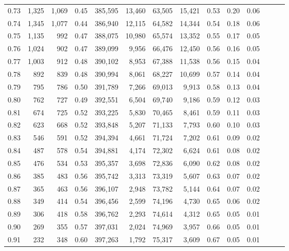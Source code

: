 \begin{tabular}{rrrrrrrrrrrrrr}
0.73 &  1,325 &  1,069 &  0.45 &  385,595 &   13,460 &  63,505 &  15,421 &  0.53 &  0.20 &      0.06 \\
0.74 &  1,345 &  1,077 &  0.44 &  386,940 &   12,115 &  64,582 &  14,344 &  0.54 &  0.18 &      0.06 \\
0.75 &  1,135 &    992 &  0.47 &  388,075 &   10,980 &  65,574 &  13,352 &  0.55 &  0.17 &      0.05 \\
0.76 &  1,024 &    902 &  0.47 &  389,099 &    9,956 &  66,476 &  12,450 &  0.56 &  0.16 &      0.05 \\
0.77 &  1,003 &    912 &  0.48 &  390,102 &    8,953 &  67,388 &  11,538 &  0.56 &  0.15 &      0.04 \\
0.78 &    892 &    839 &  0.48 &  390,994 &    8,061 &  68,227 &  10,699 &  0.57 &  0.14 &      0.04 \\
0.79 &    795 &    786 &  0.50 &  391,789 &    7,266 &  69,013 &   9,913 &  0.58 &  0.13 &      0.04 \\
0.80 &    762 &    727 &  0.49 &  392,551 &    6,504 &  69,740 &   9,186 &  0.59 &  0.12 &      0.03 \\
0.81 &    674 &    725 &  0.52 &  393,225 &    5,830 &  70,465 &   8,461 &  0.59 &  0.11 &      0.03 \\
0.82 &    623 &    668 &  0.52 &  393,848 &    5,207 &  71,133 &   7,793 &  0.60 &  0.10 &      0.03 \\
0.83 &    546 &    591 &  0.52 &  394,394 &    4,661 &  71,724 &   7,202 &  0.61 &  0.09 &      0.02 \\
0.84 &    487 &    578 &  0.54 &  394,881 &    4,174 &  72,302 &   6,624 &  0.61 &  0.08 &      0.02 \\
0.85 &    476 &    534 &  0.53 &  395,357 &    3,698 &  72,836 &   6,090 &  0.62 &  0.08 &      0.02 \\
0.86 &    385 &    483 &  0.56 &  395,742 &    3,313 &  73,319 &   5,607 &  0.63 &  0.07 &      0.02 \\
0.87 &    365 &    463 &  0.56 &  396,107 &    2,948 &  73,782 &   5,144 &  0.64 &  0.07 &      0.02 \\
0.88 &    349 &    414 &  0.54 &  396,456 &    2,599 &  74,196 &   4,730 &  0.65 &  0.06 &      0.02 \\
0.89 &    306 &    418 &  0.58 &  396,762 &    2,293 &  74,614 &   4,312 &  0.65 &  0.05 &      0.01 \\
0.90 &    269 &    355 &  0.57 &  397,031 &    2,024 &  74,969 &   3,957 &  0.66 &  0.05 &      0.01 \\
0.91 &    232 &    348 &  0.60 &  397,263 &    1,792 &  75,317 &   3,609 &  0.67 &  0.05 &      0.01 \\

\end{tabular}
